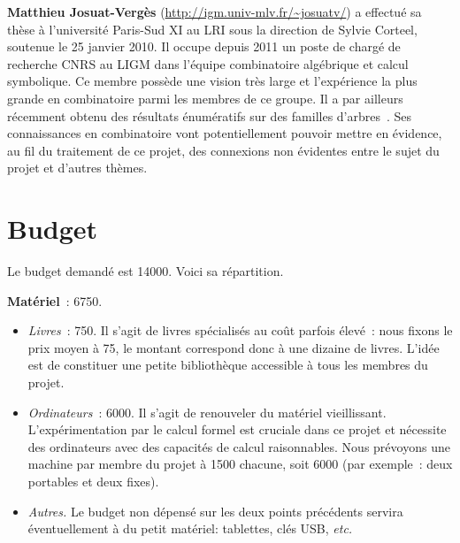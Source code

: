 \documentclass[10pt,reqno]{amsart}
\numberwithin{equation}{subsection}
\begin{document}
{\bf Matthieu Josuat-Vergès} (\url{http://igm.univ-mlv.fr/~josuatv/})
a effectué sa thèse à l'université Paris-Sud XI au LRI sous la
direction de Sylvie Corteel, soutenue le 25 janvier 2010. Il occupe
depuis 2011 un poste de chargé de recherche CNRS au LIGM dans l'équipe
combinatoire algébrique et calcul symbolique. Ce membre possède une
vision très large et l'expérience la plus grande en combinatoire parmi
les membres de ce groupe. Il a par ailleurs récemment obtenu des
résultats énumératifs sur des familles d'arbres~\cite{JV15}. Ses
connaissances en combinatoire vont potentiellement pouvoir mettre en
évidence, au fil du traitement de ce projet, des connexions non
évidentes entre le sujet du projet et d'autres thèmes.

\section{Budget}
Le budget demandé est 14000\texteuro. Voici sa répartition.
\smallskip

{\bf Matériel}~: 6750\texteuro.
\begin{itemize}[fullwidth]
    \item {\em Livres}~: 750\texteuro.
    Il s'agit de livres spécialisés au coût parfois élevé~: nous
    fixons le prix moyen à 75\texteuro, le montant correspond donc
    à une dizaine de livres. L'idée est de constituer une petite
    \og bibliothèque \fg{} accessible à tous les membres du projet.

    \item {\em Ordinateurs}~: 6000\texteuro.
    Il s'agit de renouveler du matériel vieillissant.
    L'expérimentation par le calcul formel est cruciale dans ce
    projet et nécessite des ordinateurs avec des capacités de calcul
    raisonnables. Nous prévoyons une machine par membre du projet à
    1500\texteuro{} chacune, soit 6000\texteuro{} (par exemple~:
    deux portables et deux fixes).

    \item {\em Autres.}
    Le budget non dépensé sur les deux points précédents servira
    éventuellement à du petit matériel: tablettes, clés USB, {\em etc.}
\end{itemize}
\smallskip
    
\end{document}
